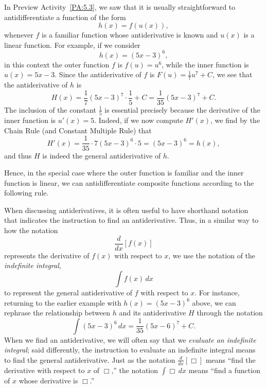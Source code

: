 In Preview Activity~\ref{PA:5.3}, we saw that it is usually straightforward to antidifferentiate a function of the form
$$h(x) = f(u(x)),$$
whenever $f$ is a familiar function whose antiderivative is known and $u(x)$ is a linear function.  For example, if we consider
$$h(x) = (5x-3)^6,$$
in this context the outer function $f$ is $f(u) = u^6$, while the inner function is $u(x) = 5x - 3$.  Since the antiderivative of $f$ is $F(u) = \frac{1}{7}u^7+C$, we 
see that the antiderivative of $h$ is
$$H(x) = \frac{1}{7} (5x-3)^7 \cdot \frac{1}{5} + C = \frac{1}{35} (5x-3)^7 + C.$$
The inclusion of the constant $\frac{1}{5}$ is essential precisely because the derivative of the inner function is $u'(x) = 5$.  Indeed, if we now compute $H'(x)$, we find by the Chain Rule (and Constant Multiple Rule) that
$$H'(x) = \frac{1}{35} \cdot 7(5x-3)^6 \cdot 5 = (5x-3)^6 = h(x),$$
and thus $H$ is indeed the general antiderivative of $h$.

Hence, in the special case where the outer function is familiar and the inner function is linear, we can antidifferentiate composite functions according to the following rule.

\vspace*{5pt}
\nin {}
\vspace*{1pt}

When discussing antiderivatives, it is often useful to have shorthand notation that indicates the instruction to find an antiderivative.  Thus, in a similar way to how the notation
$$\frac{d}{dx} \left[ f(x) \right]$$
represents the derivative of $f(x)$ with respect to $x$, we use the notation of the \emph{indefinite integral},
$$\int f(x) \, dx$$
to represent the general antiderivative of $f$ with respect to $x$.  For instance, returning to the earlier example with $h(x) = (5x-3)^6$ above, we can rephrase the relationship between $h$ and its antiderivative $H$ through the notation
$$\int (5x-3)^6 \, dx = \frac{1}{35} (5x-6)^7 + C.$$
When we find an antiderivative, we will often say that we \emph{evaluate an indefinite integral}; said differently, the instruction to evaluate an indefinite integral means to find the general antiderivative.  Just as the notation $\frac{d}{dx} [ \Box ]$ means ``find the derivative with respect to $x$ of $\Box$,''  the notation $\int \Box \, dx$ means ``find a function of $x$ whose derivative is $\Box$.''


